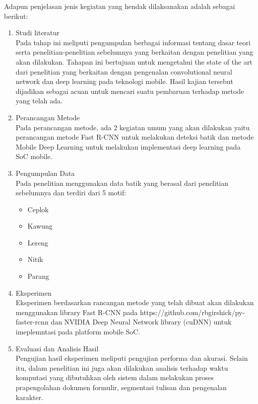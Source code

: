 Adapun penjelasan jenis kegiatan yang hendak dilaksanakan adalah sebagai
berikut:
\begin{enumerate}
	\item Studi literatur\\
	Pada tahap ini meliputi pengumpulan berbagai informasi tentang dasar teori serta penelitian-penelitian sebelumnya yang berkaitan dengan penelitian yang akan dilakukan. Tahapan ini bertujuan untuk mengetahui the state of the art dari penelitian yang berkaitan dengan pengenalan convolutional neural network dan deep learning pada teknologi mobile. Hasil kajian tersebut dijadikan sebagai acuan untuk mencari suatu pembaruan terhadap metode yang telah ada.
	\item Perancangan Metode\\
	Pada perancangan metode, ada 2 kegiatan umum yang akan dilakukan yaitu perancangan metode Fast R-CNN untuk melakukan deteksi batik dan metode Mobile Deep Learning untuk melakukan implementasi deep learning pada SoC mobile.
	\item Pengumpulan Data\\
	Pada penelitian menggunakan data batik yang berasal dari penelitian sebelumnya \cite{meta_cnn} dan terdiri dari 5 motif:
	\begin{itemize}
		\item Ceplok
		\item Kawung
		\item Lereng
		\item Nitik
		\item Parang
	\end{itemize}
	\item Eksperimen\\
	Eksperimen berdasarkan rancangan metode yang telah dibuat akan dilakukan menggunakan library Fast R-CNN pada https://github.com/rbgirshick/py-faster-rcnn dan NVIDIA Deep Neural Network library (cuDNN) untuk imeplemntasi pada platform mobile SoC.
	\item Evaluasi dan Analisis Hasil\\
	Pengujian hasil eksperimen meliputi pengujian performa dan akurasi. Selain itu, dalam penelitian ini juga akan dilakukan analisis terhadap waktu komputasi yang dibutuhkan oleh sistem dalam melakukan proses prapengolahan dokumen formulir, segmentasi tulisan dan pengenalan karakter.
\end{enumerate}

